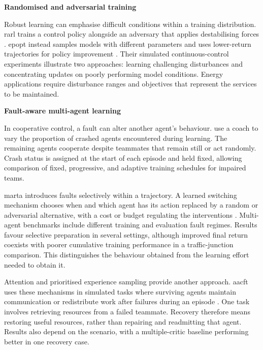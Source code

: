 \smallskip
\noindent\textbf{Randomised and adversarial training}\par\nobreak\smallskip
Robust learning can emphasise difficult conditions within a training distribution. \gls{rarl} trains a control policy alongside an adversary that applies destabilising forces \parencite{pinto2017rarl}. \gls{epopt} instead samples models with different parameters and uses lower-return trajectories for policy improvement \parencite{rajeswaran2017epopt}. Their simulated continuous-control experiments illustrate two approaches: learning challenging disturbances and concentrating updates on poorly performing model conditions. Energy applications require disturbance ranges and objectives that represent the services to be maintained.

\smallskip
\noindent\textbf{Fault-aware multi-agent learning}\par\nobreak\smallskip
In cooperative control, a fault can alter another agent's behaviour. \textcite{zhao2022crashed} use a coach to vary the proportion of crashed agents encountered during learning. The remaining agents cooperate despite teammates that remain still or act randomly. Crash status is assigned at the start of each episode and held fixed, allowing comparison of fixed, progressive, and adaptive training schedules for impaired teams.

\gls{marta} introduces faults selectively within a trajectory. A learned switching mechanism chooses when and which agent has its action replaced by a random or adversarial alternative, with a cost or budget regulating the interventions \parencite{mguni2025faulttolerant}. Multi-agent benchmarks include different training and evaluation fault regimes. Results favour selective preparation in several settings, although improved final return coexists with poorer cumulative training performance in a traffic-junction comparison. This distinguishes the behaviour obtained from the learning effort needed to obtain it.

Attention and prioritised experience sampling provide another approach. \gls{aacft} uses these mechanisms in simulated tasks where surviving agents maintain communication or redistribute work after failures during an episode \parencite{shi2024faulttolerance}. One task involves retrieving resources from a failed teammate. Recovery therefore means restoring useful resources, rather than repairing and readmitting that agent. Results also depend on the scenario, with a multiple-critic baseline performing better in one recovery case.


